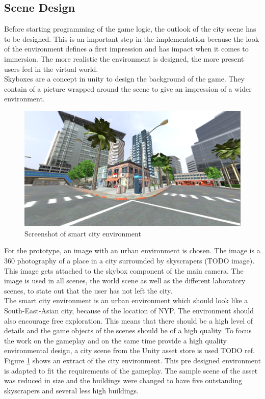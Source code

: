 \subsection{Scene Design}
Before starting programming of the game logic, the outlook of the city scene has to be designed. This is an important step in the implementation because the look of the environment defines a first impression and has impact when it comes to immersion. The more realistic the environment is designed, the more present users feel in the virtual world.\\
Skyboxes are a concept in unity to design the background of the game. They contain of a picture wrapped around the scene to give an impression of a wider environment. \cite{?}
\begin{figure}[h!]
  \includegraphics[width=16cm]{kapitel/explore-world.PNG}
  \centering
  \caption{Screenshot of smart city environment}
  \label{fig:game-world-scene}
\end{figure}
For the prototype, an image with an urban environment is chosen. The image is a 360 photography of a place in a city surrounded by skyscrapers (TODO image). This image gets attached to the skybox component of the main camera. The image is used in all scenes, the world scene as well as the different laboratory scenes, to state out that the user has not left the city. \\
The smart city environment is an urban environment which should look like a South-East-Asian city, because of the location of NYP. The environment should also encourage free exploration. This means that there should be a high level of details and the game objects of the scenes should be of a high quality. To focus the work on the gameplay and on the same time provide a high quality environmental design, a city scene from the Unity asset store is used TODO ref. Figure \ref{fig:game-world-scene} shows an extract of the city environment.  This pre designed environment is adapted to fit the requirements of the gameplay. The sample scene of the asset was reduced in size and the buildings were changed to have five outstanding skyscrapers and several less high buildings. 
